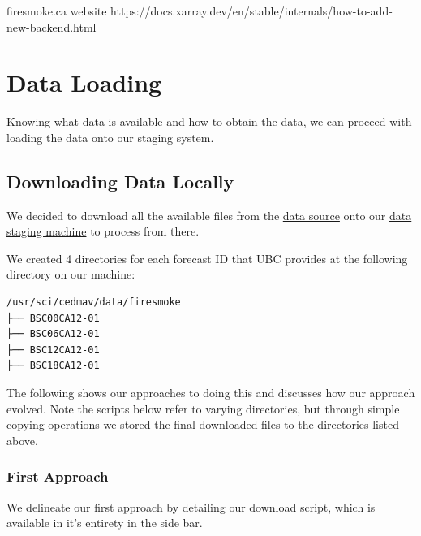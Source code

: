 \documentclass[
  letterpaper,
  DIV=11,
  numbers=noendperiod]{scrreprt}
\begin{document}
firesmoke.ca website
https://docs.xarray.dev/en/stable/internals/how-to-add-new-backend.html


\chapter{Data Loading}\label{sec-data-loading}

Knowing what data is available and how to obtain the data, we can
proceed with loading the data onto our staging system.

\section{Downloading Data Locally}\label{downloading-data-locally}

We decided to download all the available files from the
\href{data_source.qmd}{data source} onto our \href{sys_specs.qmd}{data
staging machine} to process from there.

We created 4 directories for each forecast ID that UBC provides at the
following directory on our machine:

\begin{verbatim}
/usr/sci/cedmav/data/firesmoke
├── BSC00CA12-01
├── BSC06CA12-01
├── BSC12CA12-01
├── BSC18CA12-01
\end{verbatim}

The following shows our approaches to doing this and discusses how our
approach evolved. Note the scripts below refer to varying directories,
but through simple copying operations we stored the final downloaded
files to the directories listed above.

\subsection{First Approach}\label{first-approach}

We delineate our first approach by detailing our download script, which
is available in it's entirety in the side bar.
\end{document}
